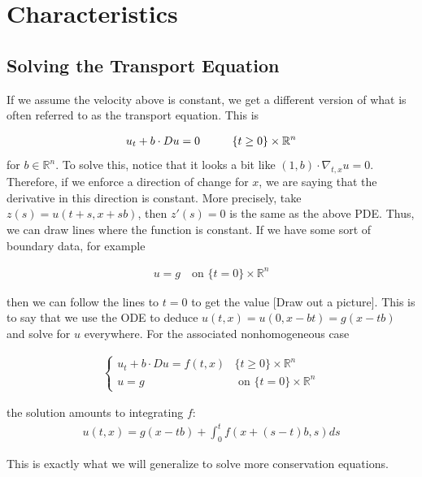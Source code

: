 \documentclass{article}
\newcommand{\R}{{\mathbb{R}}}
\begin{document}
	
	\section{Characteristics}
	
	\subsection{Solving the Transport Equation}
	
	If we assume the velocity above is constant, we get a different version of what is often referred to as the transport equation. This is 
	
	\begin{align*}
		u_{t} + b \cdot Du = 0  \hspace{1 cm} \{t \geq 0 \} \times \R^{n}
	\end{align*}
	for $b \in \R^{n}$. To solve this, notice that it looks a bit like $(1,b) \cdot \nabla_{t,x} u = 0$. Therefore, if we enforce a direction of change for $x$, we are saying that the derivative in this direction is constant. More precisely, take $z(s) = u(t+s,x+sb)$, then $z'(s)= 0$ is the same as the above PDE. Thus, we can draw lines where the function is constant. If we have some sort of boundary data, for example 
	
	\begin{align*}
		u = g \,\,\,\, \text{ on } \{t=0\} \times \R^{n}
	\end{align*}
	
	then we can follow the lines to $t=0$ to get the value [Draw out a picture]. This is to say that we use the ODE to deduce $u(t,x) = u(0,x-bt) = g(x-tb)$ and solve for $u$ everywhere. For the associated nonhomogeneous case
	
	\begin{align*}
		\begin{cases}
			u_{t} + b \cdot Du = f(t,x) & \{t \geq 0 \} \times \R^{n} \\
			u = g & \text{ on } \{t=0\} \times \R^{n}
		\end{cases}
	\end{align*}
	
	the solution amounts to integrating $f$:
	\begin{align*}
		u(t,x) = g(x-tb) + \int_{0}^{t} f(x+(s-t)b,s)ds
	\end{align*}
	
	This is exactly what we will generalize to solve more conservation equations.   
	
	
	
\end{document}
